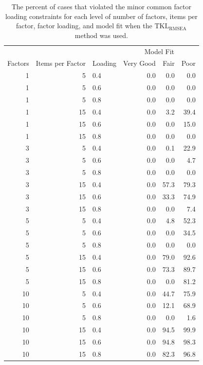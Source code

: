\documentclass[11pt]{umnthesis}
\begin{document}
\begin{table}[tbp]

\begin{center}
\begin{threeparttable}

\caption{\label{tab:tab-major-minor-factors}The percent of cases that violated the minor common factor loading constraints for each level of number of factors, items per factor, factor loading, and model fit when the \(\textrm{TKL}_{\textrm{RMSEA}}\) method was used.}

\small{

\begin{tabular}{rrlrrr}
\toprule
 &  &  & \multicolumn{3}{c}{Model Fit} \\
\cmidrule(r){4-6}
Factors & Items per Factor & Loading & Very Good & Fair & Poor\\
\midrule
1 & 5 & 0.4 & 0.0 & 0.0 & 0.0\\
1 & 5 & 0.6 & 0.0 & 0.0 & 0.0\\
1 & 5 & 0.8 & 0.0 & 0.0 & 0.0\\
1 & 15 & 0.4 & 0.0 & 3.2 & 39.4\\
1 & 15 & 0.6 & 0.0 & 0.0 & 15.0\\
1 & 15 & 0.8 & 0.0 & 0.0 & 0.0\\
3 & 5 & 0.4 & 0.0 & 0.1 & 22.9\\
3 & 5 & 0.6 & 0.0 & 0.0 & 4.7\\
3 & 5 & 0.8 & 0.0 & 0.0 & 0.0\\
3 & 15 & 0.4 & 0.0 & 57.3 & 79.3\\
3 & 15 & 0.6 & 0.0 & 33.3 & 74.9\\
3 & 15 & 0.8 & 0.0 & 0.0 & 7.4\\
5 & 5 & 0.4 & 0.0 & 4.8 & 52.3\\
5 & 5 & 0.6 & 0.0 & 0.0 & 34.5\\
5 & 5 & 0.8 & 0.0 & 0.0 & 0.0\\
5 & 15 & 0.4 & 0.0 & 79.0 & 92.6\\
5 & 15 & 0.6 & 0.0 & 73.3 & 89.7\\
5 & 15 & 0.8 & 0.0 & 0.0 & 81.2\\
10 & 5 & 0.4 & 0.0 & 44.7 & 75.9\\
10 & 5 & 0.6 & 0.0 & 12.1 & 68.9\\
10 & 5 & 0.8 & 0.0 & 0.0 & 1.6\\
10 & 15 & 0.4 & 0.0 & 94.5 & 99.9\\
10 & 15 & 0.6 & 0.0 & 94.8 & 98.3\\
10 & 15 & 0.8 & 0.0 & 82.3 & 96.8\\
\bottomrule
\end{tabular}

}

\end{threeparttable}
\end{center}

\end{table}
\end{document}
